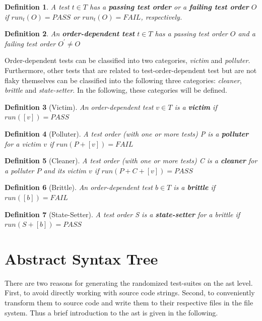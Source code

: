 \documentclass[
fancyheadings, %
%
%
]{stsreprt}
\newtheorem{definition}{Definition}
\begin{document}
\begin{definition}
    A test $t \in T$ has a \textbf{passing test order} or a \textbf{failing test order} $O$ if $run_t(O) = PASS$ or $run_t(O) = FAIL$, respectively.
\end{definition}

\begin{definition}
    An \textbf{order-dependent test} $t \in T$ has a passing test order $O$ and a failing test order $O^{'} \neq O$
\end{definition}

Order-dependent tests can be classified into two categories, \textit{victim} and \textit{polluter}. Furthermore, other tests that are related to test-order-dependent test but are not flaky themselves can be classified into the following three categories: \textit{cleaner}, \textit{brittle} and \textit{state-setter}. In the following, these categories will be defined. 

\begin{definition}[Victim]
    An order-dependent test $v \in T$ is a \textbf{victim} if $run([v]) = PASS$
\end{definition} 

\begin{definition}[Polluter]
    A test order (with one or more tests) P is a \textbf{polluter} for a victim $v$ if $run(P + [v]) = FAIL$
\end{definition}

\begin{definition}[Cleaner]
    A test order (with one or more tests) C is a \textbf{cleaner} for a polluter $P$ and its victim $v$ if $run(P + C + [v]) = PASS$
\end{definition}

\begin{definition}[Brittle]
    An order-dependent test $b \in T$ is a \textbf{brittle} if $run([b]) = FAIL$
\end{definition}

\begin{definition}[State-Setter] %
    A test order S is a \textbf{state-setter} for a brittle if $run(S + [b]) = PASS$
\end{definition}

\section{Abstract Syntax Tree}
There are two reasons for generating the randomized test-suites on the \acrlong{ast} level. 
First, to avoid directly working with source code strings. 
Second, to conveniently transform them to source code and write them to their respective files in the file system. 
Thus a brief introduction to the \acrshort{ast} is given in the following. \par
\end{document}
